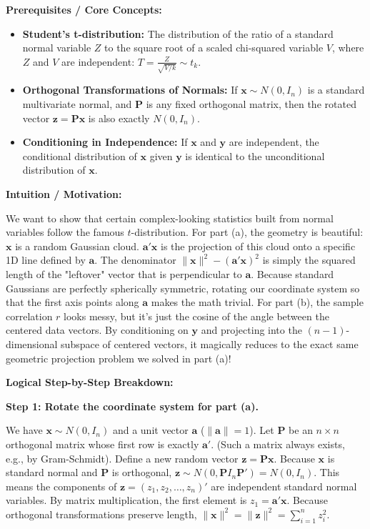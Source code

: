 \begin{solution}
\textbf{Prerequisites / Core Concepts:}
\begin{itemize}
    \item \textbf{Student's t-distribution:} The distribution of the ratio of a standard normal variable $Z$ to the square root of a scaled chi-squared variable $V$, where $Z$ and $V$ are independent: $T = \frac{Z}{\sqrt{V/k}} \sim t_k$.
    \item \textbf{Orthogonal Transformations of Normals:} If $\mathbf{x} \sim N(0, I_n)$ is a standard multivariate normal, and $\mathbf{P}$ is any fixed orthogonal matrix, then the rotated vector $\mathbf{z} = \mathbf{Px}$ is also exactly $N(0, I_n)$.
    \item \textbf{Conditioning in Independence:} If $\mathbf{x}$ and $\mathbf{y}$ are independent, the conditional distribution of $\mathbf{x}$ given $\mathbf{y}$ is identical to the unconditional distribution of $\mathbf{x}$.
\end{itemize}

\textbf{Intuition / Motivation:}

We want to show that certain complex-looking statistics built from normal variables follow the famous $t$-distribution. 
For part (a), the geometry is beautiful: $\mathbf{x}$ is a random Gaussian cloud. $\mathbf{a}'\mathbf{x}$ is the projection of this cloud onto a specific 1D line defined by $\mathbf{a}$. The denominator $\|\mathbf{x}\|^2 - (\mathbf{a}'\mathbf{x})^2$ is simply the squared length of the "leftover" vector that is perpendicular to $\mathbf{a}$. Because standard Gaussians are perfectly spherically symmetric, rotating our coordinate system so that the first axis points along $\mathbf{a}$ makes the math trivial.
For part (b), the sample correlation $r$ looks messy, but it's just the cosine of the angle between the centered data vectors. By conditioning on $\mathbf{y}$ and projecting into the $(n-1)$-dimensional subspace of centered vectors, it magically reduces to the exact same geometric projection problem we solved in part (a)!

\textbf{Logical Step-by-Step Breakdown:}

\textbf{Step 1: Rotate the coordinate system for part (a).}

We have $\mathbf{x} \sim N(0, I_n)$ and a unit vector $\mathbf{a}$ ($\|\mathbf{a}\| = 1$).
Let $\mathbf{P}$ be an $n \times n$ orthogonal matrix whose first row is exactly $\mathbf{a}'$. (Such a matrix always exists, e.g., by Gram-Schmidt).
Define a new random vector $\mathbf{z} = \mathbf{Px}$.
Because $\mathbf{x}$ is standard normal and $\mathbf{P}$ is orthogonal, $\mathbf{z} \sim N(0, \mathbf{P} I_n \mathbf{P}') = N(0, I_n)$.
This means the components of $\mathbf{z} = (z_1, z_2, \dots, z_n)'$ are independent standard normal variables.
By matrix multiplication, the first element is $z_1 = \mathbf{a}'\mathbf{x}$.
Because orthogonal transformations preserve length, $\|\mathbf{x}\|^2 = \|\mathbf{z}\|^2 = \sum_{i=1}^n z_i^2$.


\end{solution}
